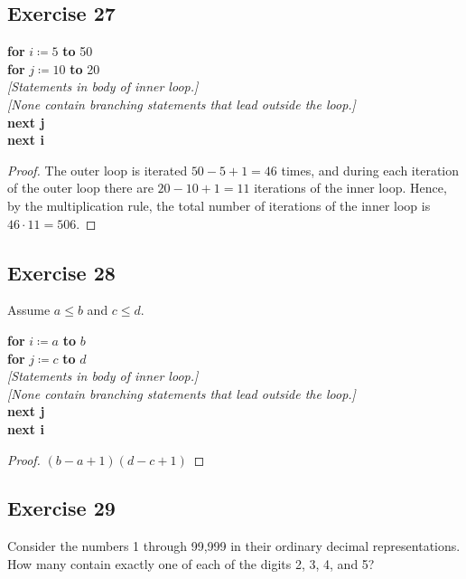\documentclass[14pt]{extarticle}
\begin{document}
\subsection{Exercise 27}
\begin{tabbing}
{\bf for} \= \(i \coloneqq 5\) {\bf to} 50 \\
          \> {\bf for} \= \(j \coloneqq 10\) {\bf to} 20 \\
          \>           \> {\it [Statements in body of inner loop.]} \\
          \>           \> {\it [None contain branching statements that lead outside the loop.]} \\
          \> {\bf next j} \\
{\bf next i}
\end{tabbing}

\begin{proof}
The outer loop is iterated \(50 - 5 + 1 = 46\) times, and during each iteration of the outer loop there are 
\(20 - 10 + 1 = 11\) iterations of the inner loop. Hence, by the multiplication rule, the total number of iterations 
of the inner loop is \(46 \cdot 11 = 506\).
\end{proof}

\subsection{Exercise 28}
Assume \(a \leq b\) and \(c \leq d\).
\begin{tabbing}
{\bf for} \= \(i \coloneqq a\) {\bf to} $b$ \\
          \> {\bf for} \= \(j \coloneqq c\) {\bf to} $d$ \\
          \>           \> {\it [Statements in body of inner loop.]} \\
          \>           \> {\it [None contain branching statements that lead outside the loop.]} \\
          \> {\bf next j} \\
{\bf next i}
\end{tabbing}

\begin{proof}
\((b-a+1)(d-c+1)\)
\end{proof}

\subsection{Exercise 29}
Consider the numbers 1 through 99,999 in their ordinary decimal representations. How many contain exactly one of 
each of the digits 2, 3, 4, and 5?
\end{document}
